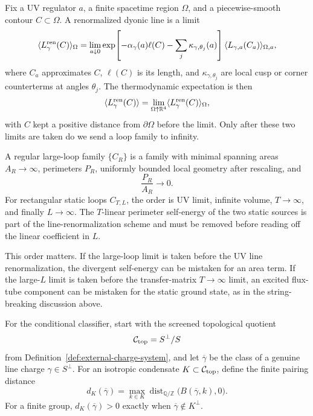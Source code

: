 \begin{definition}
\label{def:continuum-line-limit-large-loop-topology}
Fix a UV regulator \(a\), a finite spacetime region \(\Omega\), and a
piecewise-smooth contour \(C\subset\Omega\).  A renormalized dyonic line is a
limit
\begin{equation}
  \langle L_\gamma^{\rm ren}(C)\rangle_\Omega
  =
  \lim_{a\downarrow0}
  \exp\!\left[
    -\alpha_\gamma(a)\ell(C)
    -\sum_j\kappa_{\gamma,\theta_j}(a)
  \right]
  \langle L_{\gamma,a}(C_a)\rangle_{\Omega,a},
  \label{eq:continuum-line-renormalization-limit}
\end{equation}
where \(C_a\) approximates \(C\), \(\ell(C)\) is its length, and
\(\kappa_{\gamma,\theta_j}\) are local cusp or corner counterterms at angles
\(\theta_j\).  The thermodynamic expectation is then
\[
  \langle L_\gamma^{\rm ren}(C)\rangle
  =
  \lim_{\Omega\uparrow\mathbb R^4}
  \langle L_\gamma^{\rm ren}(C)\rangle_\Omega,
\]
with \(C\) kept a positive distance from \(\partial\Omega\) before the limit.
Only after these two limits are taken do we send a loop family to infinity.

A regular large-loop family \(\{C_R\}\) is a family with minimal spanning areas
\(A_R\to\infty\), perimeters \(P_R\), uniformly bounded local geometry after
rescaling, and
\[
  \frac{P_R}{A_R}\longrightarrow0 .
\]
For rectangular static loops \(C_{T,L}\), the order is UV limit, infinite
volume, \(T\to\infty\), and finally \(L\to\infty\).  The \(T\)-linear perimeter
self-energy of the two static sources is part of the line-renormalization
scheme and must be removed before reading off the linear coefficient in \(L\).
\end{definition}

This order matters.  If the large-loop limit is taken before the UV line
renormalization, the divergent self-energy can be mistaken for an area term.
If the large-\(L\) limit is taken before the transfer-matrix \(T\to\infty\)
limit, an excited flux-tube component can be mistaken for the static ground
state, as in the string-breaking discussion above.

For the conditional classifier, start with the screened topological quotient
\[
  \mathcal C_{\rm top}=S^\perp/S
\]
from Definition~\ref{def:external-charge-system}, and let
\(\overline\gamma\) be the class of a genuine line charge
\(\gamma\in S^\perp\).  For an isotropic condensate
\(K\subset\mathcal C_{\rm top}\), define the finite pairing distance
\[
  d_K(\overline\gamma)
  =
  \max_{k\in K}
  \operatorname{dist}_{\mathbb Q/\mathbb Z}
  \bigl(B(\overline\gamma,k),0\bigr).
\]
For a finite group, \(d_K(\overline\gamma)>0\) exactly when
\(\overline\gamma\notin K^\perp\).


